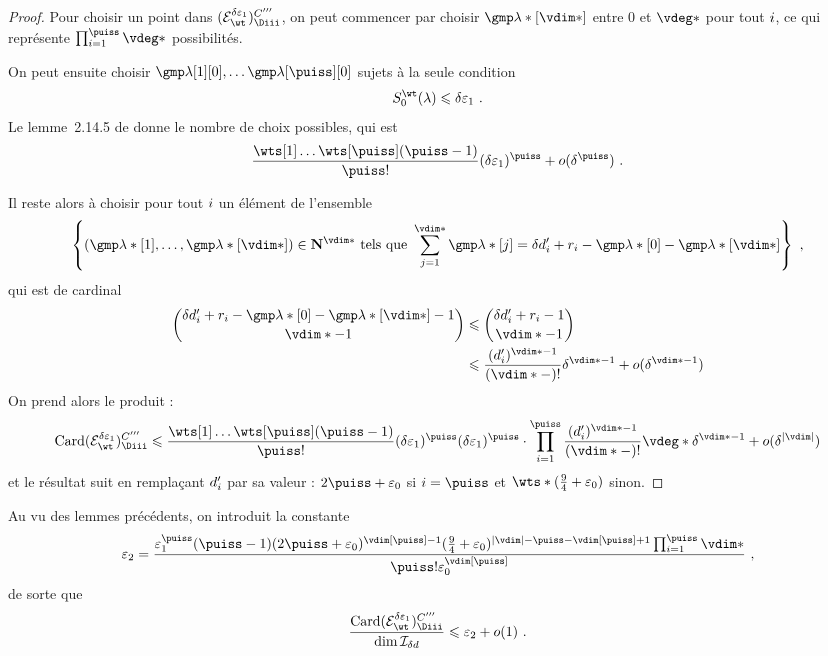 \begin{proof}
  Pour choisir un point dans \( (\stairs)\Ciii \), on peut commencer par
  choisir \( \imp*[\vdim*] \) entre \( 0 \) et \( \vdeg* \)
  pour tout \( i \), ce qui représente \( \prod\fctrange \vdeg* \)
  possibilités.

  On peut ensuite choisir \( \imp[1][0], \dots \imp[\puiss][0] \)
  sujets à la seule condition
  \begin{equation}
    \wtsum*(\lambda) \le \delta \epsi \pmm.
  \end{equation}
  Le lemme~2.14.5 de \cite{farhith} donne le nombre de choix possibles, qui
  est
  \begin{equation}
    \frac {\prodwt} {\puiss !} (\delta\epsi)^\puiss
    + o(\delta^\puiss)
    \pmm.
  \end{equation}

  Il reste alors à choisir pour tout \( i \) un élément de l'ensemble
  \begin{equation}
    \left\{
      (\imp*[1],  \dots, \imp*[\vdim*])
      \in \N ^{\vdim*}
      \text{ tels que }
      \sum_{j=1}^{\vdim*} \imp*[j]
      =
      \delta d'_\fct + r_\fct - \imp*[0] - \imp*[\vdim*]
    \right\}
    \pmm,
  \end{equation}
  qui est de cardinal
  \begin{align}
    \binom {
      \delta d'_\fct + r_\fct - \imp*[0] - \imp*[\vdim*] - 1
      }{
      \vdim* - 1
      }
    & \le
    \binom {
      \delta d'_\fct + r_\fct - 1
      }{
      \vdim* - 1
      }
    \\
    & \le
    \frac {(d'_\fct)^{\vdim* - 1}} {(\vdim* - )!} \delta^{\vdim* - 1}
    + o( \delta^{\vdim* - 1} )
  \end{align}
  On prend alors le produit :
  \begin{equation}
    \card (\stairs)\Ciii
    \le
    \frac {\prodwt} {\puiss !} (\delta\epsi)^\puiss
    (\delta\epsi)^\puiss
    \cdot \prod\fctrange
    \frac {(d'_\fct)^{\vdim* - 1}} {(\vdim* - )!}
    \vdeg* \delta^{\vdim* - 1}
    + o( \delta^{\lgr\vdim} )
  \end{equation}
  et le résultat suit en remplaçant \( d'_i \) par sa valeur : \( 2\puiss +
  \epsz \) si \( \fct = \puiss \) et \( \wts* (\frac94 + \epsz) \) sinon.
\end{proof}

Au vu des lemmes précédents, on introduit la constante
\begin{equation} \label{e:def-epsii}
  \epsii
  =
  \frac {
    \epsi^\puiss (\puiss-1)
    (2\puiss + \epsz) ^{\vdim[\puiss]-1}
    (\frac94 + \epsz) ^{\lgr\vdim - \puiss - \vdim[\puiss] + 1}
    \prod\fctrange \vdim*
    }{
    \puiss! \epsz^{\vdim[\puiss]}
    }
  \pmm,
\end{equation}
de sorte que
\begin{equation} \label{e:good-codim}
  \frac {\card (\stairs)\Ciii} {\dim \Ideal_{\delta d}}
  \le
  \epsii + o(1)
  \pmm.
\end{equation}

